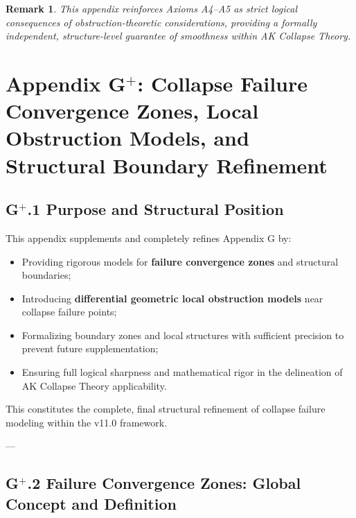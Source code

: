 \documentclass[11pt]{article}
\newtheorem{remark}[theorem]{Remark}
\begin{document}
\begin{remark}
This appendix reinforces Axioms A4–A5 as strict logical consequences of obstruction-theoretic considerations, providing a formally independent, structure-level guarantee of smoothness within AK Collapse Theory.
\end{remark}




\section*{Appendix G$^{+}$: Collapse Failure Convergence Zones, Local Obstruction Models, and Structural Boundary Refinement}

\subsection*{G$^{+}$.1 Purpose and Structural Position}

This appendix supplements and completely refines Appendix G by:

\begin{itemize}
    \item Providing rigorous models for \textbf{failure convergence zones} and structural boundaries;
    \item Introducing \textbf{differential geometric local obstruction models} near collapse failure points;
    \item Formalizing boundary zones and local structures with sufficient precision to prevent future supplementation;
    \item Ensuring full logical sharpness and mathematical rigor in the delineation of AK Collapse Theory applicability.
\end{itemize}

This constitutes the complete, final structural refinement of collapse failure modeling within the v11.0 framework.

---

\subsection*{G$^{+}$.2 Failure Convergence Zones: Global Concept and Definition}
\end{document}
